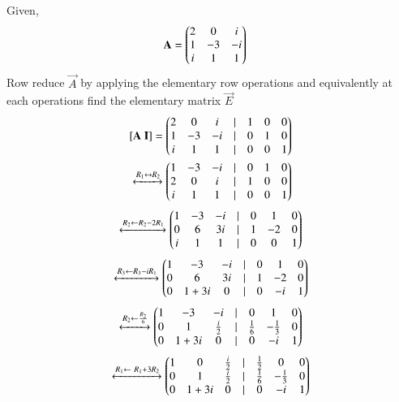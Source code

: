 Given,
\begin{align}
&\mathbf{A}=\begin{pmatrix}2 & 0 & i \\ 1 & -3 & -i \\ i & 1 &  1\end{pmatrix}
\end{align}
Row reduce $\vec{A}$ by applying the elementary row operations and equivalently at each operations find the elementary matrix $\vec{E}$
\begin{align}
	\mathbf{[A \ I]} = \begin{pmatrix} 2 & 0 & i &| & 1 & 0 & 0\\
				1 & -3 & -i &| & 0 & 1 & 0 \\
				i & 1 & 1 &| & 0 & 0 & 1\end{pmatrix}\\
			\xleftrightarrow[]{R_1 \leftrightarrow R_2}
			\begin{pmatrix} 1 & -3 & -i& | & 0& 1 & 0\\
                                2 & 0 & i &| & 1 & 0 &0\\
                                i & 1 & 1 &| & 0 & 0 & 1\end{pmatrix}
\end{align}
\begin{align}
			\xleftrightarrow[]{R_2 \leftarrow R_2 - 2R_1}
                        \begin{pmatrix} 1 & -3 & -i &| & 0 & 1 & 0 \\
                                0 & 6 & 3i &| & 1 & -2 & 0 \\
                                i & 1 & 1 &| & 0 & 0 & 1\end{pmatrix}
\end{align}
\begin{align}
			\xleftrightarrow[]{R_3 \leftarrow R_3 - iR_1}
                        \begin{pmatrix} 1 & -3 & -i &| & 0 & 1 & 0 \\
                                0 & 6 & 3i &| & 1 & -2 &0\\
                                0 & 1+3i & 0 &| & 0 & -i & 1\end{pmatrix}
\end{align}
\begin{align}
\xleftrightarrow[]{R_2 \leftarrow \frac{R_2}{6}}
                \begin{pmatrix} 1 & -3 & -i &| & 0 & 1 & 0 \\
			0 & 1 & \frac{i}{2}&| & \frac{1}{6} & -\frac{1}{3} & 0 \\
			0 & 1+3i & 0 &| & 0 & -i & 1\end{pmatrix}
\end{align}
\begin{align}
\xleftrightarrow[]{R_1 \leftarrow \ R_1 + 3R_2}
                \begin{pmatrix} 1 & 0 & \frac{i}{2} &| & \frac{1}{2} & 0 & 0 \\
			0 & 1 & \frac{i}{2}&| & \frac{1}{6} & -\frac{1}{3} & 0 \\
			0 & 1+3i & 0 &| & 0 & -i & 1\end{pmatrix}
\end{align}
